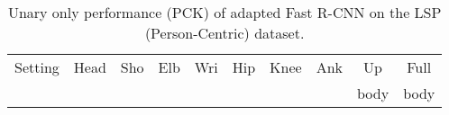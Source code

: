 \tabcolsep 1.0pt
\begin{table}[tbp]
 \scriptsize
  \centering
  \begin{tabular}{@{} l c ccc ccc cc@{}}
    \toprule
    Setting& Head   & Sho  & Elb & Wri & Hip & Knee & Ank & Up & Full\\
           &        &           &       &       &     &      &       & body  & body \\
    \midrule
    
    \midrule
    
    \midrule    
    
    
    
    
    
    
    
    
    \midrule
     
    
    
    \bottomrule
  \end{tabular}
  \caption[]{Unary only performance (PCK) of adapted Fast R-CNN on the LSP (Person-Centric) dataset.}
    \vspace{-0.5em}
  \label{tab:rcnn}
\end{table}
